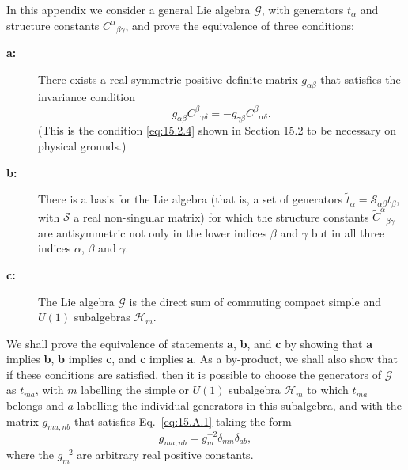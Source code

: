 
In this appendix we consider a general Lie algebra $\mathcal G$, with generators $t_\alpha$ and structure constants $C^\alpha{}_{\beta\gamma}$, and prove the equivalence of three conditions:

\begin{description}
\item[\textbf{a:}] There exists a real symmetric positive-definite matrix $g_{\alpha\beta}$ that satisfies the invariance condition
\begin{equation}
 g_{\alpha\beta}C^\beta{}_{\gamma\delta}
 =-g_{\gamma\beta}C^\beta{}_{\alpha\delta}.
 \tag{15.A.1}\label{eq:15.A.1}
\end{equation}
(This is the condition \eqref{eq:15.2.4} shown in Section 15.2 to be necessary on physical grounds.)

\item[\textbf{b:}] There is a basis for the Lie algebra (that is, a set of generators $\widetilde t_\alpha=\mathcal S_{\alpha\beta}t_\beta$, with $\mathcal S$ a real non-singular matrix) for which the structure constants $\widetilde C^\alpha{}_{\beta\gamma}$ are antisymmetric not only in the lower indices $\beta$ and $\gamma$ but in all three indices $\alpha$, $\beta$ and $\gamma$.

\item[\textbf{c:}] The Lie algebra $\mathcal G$ is the direct sum of commuting compact simple and $U(1)$ subalgebras $\mathcal H_m$.
\end{description}

We shall prove the equivalence of statements \textbf{a}, \textbf{b}, and \textbf{c} by showing that \textbf{a} implies \textbf{b}, \textbf{b} implies \textbf{c}, and \textbf{c} implies \textbf{a}. As a by-product, we shall also show that if these conditions are satisfied, then it is possible to choose the generators of $\mathcal G$ as $t_{ma}$, with $m$ labelling the simple or $U(1)$ subalgebra $\mathcal H_m$ to which $t_{ma}$ belongs and $a$ labelling the individual generators in this subalgebra, and with the matrix $g_{ma,nb}$ that satisfies Eq.~\eqref{eq:15.A.1} taking the form
\begin{equation}
 g_{ma,nb}=g_m^{-2}\delta_{mn}\delta_{ab},
 \tag{15.A.2}\label{eq:15.A.2}
\end{equation}
where the $g_m^{-2}$ are arbitrary real positive constants.

